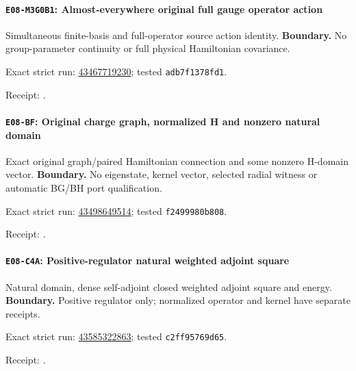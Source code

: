 \paragraph{\texttt{E08-M3G0B1}: Almost-everywhere original full gauge operator action}
Simultaneous finite-basis and full-operator source action identity.
\textbf{Boundary.} No group-parameter continuity or full physical Hamiltonian covariance.
\par\noindent Exact strict run: \href{https://github.com/etblink/math/actions/runs/43467719230}{43467719230}; tested \texttt{adb7f1378fd1}.\par
\begingroup\small\sloppy\noindent Receipt: .\par\endgroup
\paragraph{\texttt{E08-BF}: Original charge graph, normalized H and nonzero natural domain}
Exact original graph/paired Hamiltonian connection and some nonzero H-domain vector.
\textbf{Boundary.} No eigenstate, kernel vector, selected radial witness or automatic BG/BH port qualification.
\par\noindent Exact strict run: \href{https://github.com/etblink/math/actions/runs/43498649514}{43498649514}; tested \texttt{f2499980b808}.\par
\begingroup\small\sloppy\noindent Receipt: .\par\endgroup
\paragraph{\texttt{E08-C4A}: Positive-regulator natural weighted adjoint square}
Natural domain, dense self-adjoint closed weighted adjoint square and energy.
\textbf{Boundary.} Positive regulator only; normalized operator and kernel have separate receipts.
\par\noindent Exact strict run: \href{https://github.com/etblink/math/actions/runs/43585322863}{43585322863}; tested \texttt{c2ff95769d65}.\par
\begingroup\small\sloppy\noindent Receipt: .\par\endgroup
